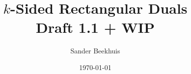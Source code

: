 




%


\title{$k$-Sided Rectangular Duals \\ \normalsize Draft 1.1 + WIP}
\author{Sander Beekhuis}
\date{\today} %



\maketitle
















%
%
%


\printbibliography

